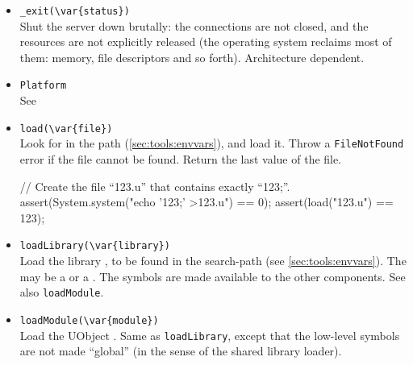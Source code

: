 \begin{itemize}

\item \lstinline'_exit(\var{status})'\\
  Shut the server down brutally: the connections are not closed, and
  the resources are not explicitly released (the operating system
  reclaims most of them: memory, file descriptors and so forth).
  Architecture dependent.

\item \lstinline'Platform'\\
  See 

\item \lstinline|load(\var{file})|\\
  Look for  in the \urbi path (\autoref{sec:tools:envvars}),
  and load it.  Throw a \lstinline|FileNotFound| error if the file
  cannot be found.  Return the last value of the file.
\begin{urbiscript}
// Create the file ``123.u'' that contains exactly ``123;''.
assert(System.system("echo '123;' >123.u") == 0);
assert(load("123.u") == 123);
\end{urbiscript}

\item \lstinline'loadLibrary(\var{library})'\\
  Load the library , to be found in the
   search-path (see
  \autoref{sec:tools:envvars}).  The  may be a
   or a .  The \Cxx symbols are made
  available to the other \Cxx components.  See also
  \lstinline|loadModule|.

\item \lstinline'loadModule(\var{module})'\\
  Load the UObject .  Same as \lstinline|loadLibrary|,
  except that the low-level \Cxx symbols are not made ``global'' (in
  the sense of the shared library loader).


\end{itemize}
